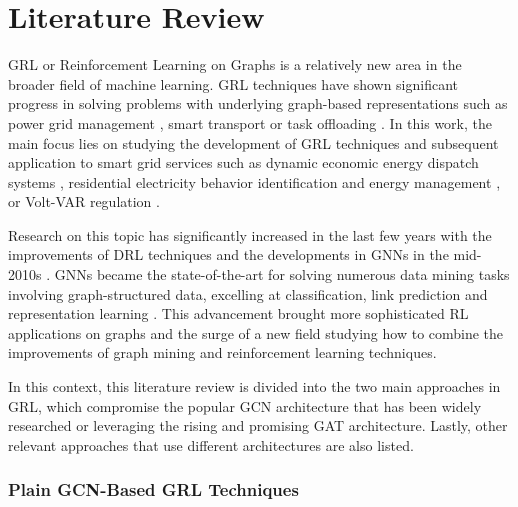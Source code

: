 \chapter{Literature Review} \label{chap:literature-review}

\ac{GRL} or Reinforcement Learning on Graphs is a relatively new area in the broader field of machine learning. \ac{GRL} techniques have shown significant progress in solving problems with underlying graph-based representations such as power grid management \cite{liNovelGraphReinforcement2022, chenGraphRepresentationLearningbased2023}, smart transport \cite{xingBilevelGraphReinforcement2023, almasanDeepReinforcementLearning2022} or task offloading \cite{gaoFastAdaptiveTask2023, liGraphReinforcementLearningbased2022}. In this work, the main focus lies on studying the development of \ac{GRL} techniques and subsequent application to smart grid services such as dynamic economic energy dispatch systems \cite{chenScalableGraphReinforcement2023, xingRealtimeOptimalScheduling2023}, residential electricity behavior identification and energy management \cite{chenGraphRepresentationLearningbased2023}, or Volt-VAR regulation \cite{huMultiagentGraphReinforcement2024}.  \par
Research on this topic has significantly increased in the last few years with the improvements of \ac{DRL} techniques and the developments in \acp{GNN} in the mid-2010s \cite{kipfSemiSupervisedClassificationGraph2017, velickovicGraphAttentionNetworks2018, liGatedGraphSequence2016, gaoGraphUNets2019}. \acp{GNN} became the state-of-the-art for solving numerous data mining tasks involving graph-structured data, excelling at classification, link prediction and representation learning \cite{xuHowPowerfulAre2019, nieReinforcementLearningGraphs2023}. This advancement brought more sophisticated \ac{RL} applications on graphs and the surge of a new field studying how to combine the improvements of graph mining and reinforcement learning techniques. \par
In this context, this literature review is divided into the two main approaches in \ac{GRL}, which compromise the popular \ac{GCN} architecture that has been widely researched or leveraging the rising and promising \ac{GAT} architecture. Lastly, other relevant approaches that use different architectures are also listed.


\subsection{Plain GCN-Based GRL Techniques}

